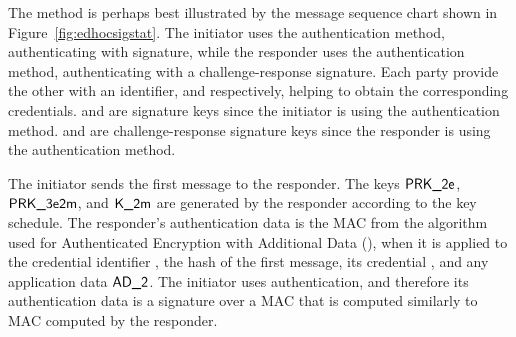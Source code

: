 %
%
The \mSigStat{} method is perhaps best illustrated by the message sequence chart
shown in Figure~\ref{fig:edhocsigstat}.
%
The initiator uses the \mSig{} authentication method, authenticating with
signature,
while the responder uses the \mStat{} authentication method,
authenticating with a challenge-response signature.
%
Each party provide the other with an identifier,
\mIdcredi{} and \mIdcredr{} respectively, helping to obtain the corresponding
credentials.
%
\mCredi{} and \mLtki{} are signature keys since the initiator is using the
\mSig authentication method.
%
\mCredr{} and \mLtkr{} are challenge-response signature keys since the responder
is using the \mStat authentication method.
%

The initiator sends the first message to the responder.
%
The keys $\textsf{PRK\_2e}$, $\textsf{PRK\_3e2m}$, and $\textsf{K\_2m}$ are generated by the responder
according to the key schedule.
%
The responder's authentication data \mAuthr{} is the MAC from the algorithm used
for Authenticated Encryption with Additional Data (\mAead{}), when it is applied
to the credential identifier \mIdcredr{}, the hash of the first
message, its credential \mCredr{}, and any application data $\textsf{AD\_2}$.
%
The initiator uses \mSig{} authentication, and therefore its
authentication data
\mAuthi{} is a signature over a MAC that is computed similarly to MAC computed
by the responder.

